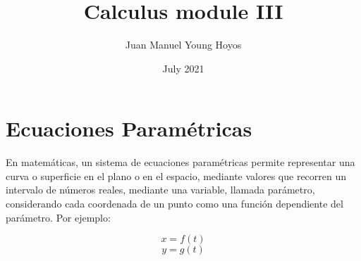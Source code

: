 \documentclass{article}
\title{Calculus module III}
\author{Juan Manuel Young Hoyos}
\date{July 2021}
\begin{document}
\maketitle

\section*{Ecuaciones Paramétricas}
En matemáticas, un sistema de ecuaciones paramétricas permite representar una curva o superficie
en el plano o en el espacio, mediante valores que recorren un intervalo de números reales, mediante
una variable, llamada parámetro, considerando cada coordenada de un punto como una función dependiente
del parámetro.
Por ejemplo:

\[ x = f(t)\]
\[ y = g(t)\]


\end{document}

